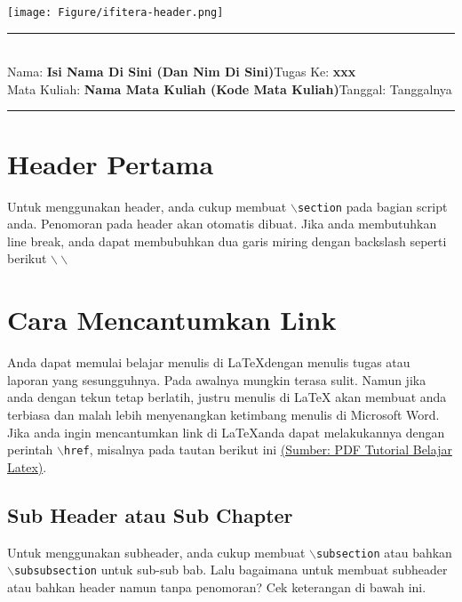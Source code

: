\documentclass[11pt,a4paper]{article}
\newcommand{\student}{\textbf{Isi Nama Di Sini (Dan Nim Di Sini)}}
\newcommand{\course}{\textbf{Nama Mata Kuliah (Kode Mata Kuliah)}}
\newcommand{\assignment}{\textbf{xxx}}
\begin{document}
\thispagestyle{empty}
\begin{center}
	\texttt{[image: Figure/ifitera-header.png]}
	\vspace{0.1cm}
\end{center}
\noindent
\rule{17cm}{0.2cm}\\[0.3cm]
Nama: \student \hfill Tugas Ke: \assignment\\[0.1cm]
Mata Kuliah: \course \hfill Tanggal: Tanggalnya\\
\rule{17cm}{0.05cm}
\vspace{0.1cm}



\section{Header Pertama}
    Untuk menggunakan header, anda cukup membuat $\backslash${\tt{section}} pada bagian script anda. Penomoran pada header akan otomatis dibuat. Jika anda membutuhkan line break, anda dapat membubuhkan dua garis miring dengan backslash seperti berikut $\backslash\backslash$

\section{Cara Mencantumkan Link}
    Anda dapat memulai belajar menulis di \LaTeX dengan menulis tugas atau laporan yang sesungguhnya. Pada awalnya mungkin terasa sulit. Namun jika anda dengan tekun tetap berlatih, justru menulis di LaTeX akan membuat anda terbiasa dan malah lebih menyenangkan ketimbang menulis di Microsoft Word.\\
    Jika anda ingin mencantumkan link di \LaTeX anda dapat melakukannya dengan perintah $\backslash${\tt{href}}, misalnya pada tautan berikut ini \href{http://aldi_tob_2000.staff.gunadarma.ac.id/Downloads/files/17359/Membuat+dokumen+dengan+latex.pdf}{(Sumber: PDF Tutorial Belajar Latex)}.
    
\subsection{Sub Header atau Sub Chapter}
     Untuk menggunakan subheader, anda cukup membuat $\backslash${\tt{subsection}} atau bahkan  $\backslash${\tt{subsubsection}} untuk sub-sub bab. Lalu bagaimana untuk membuat subheader atau bahkan header namun tanpa penomoran? Cek keterangan di bawah ini.
\end{document}
